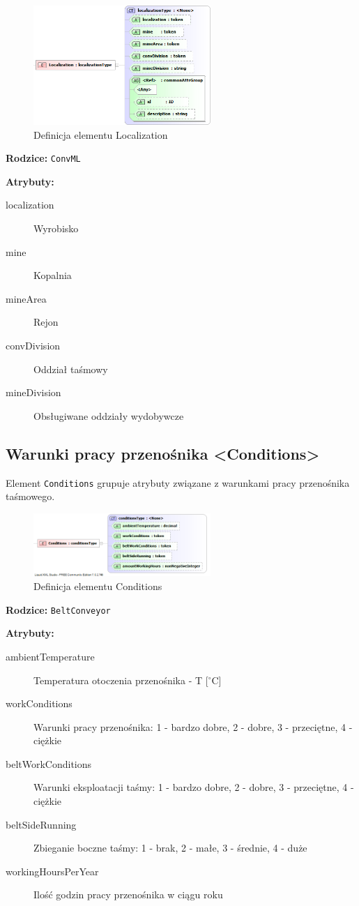 \documentclass[12pt,a4paper]{article}
\begin{document}
\begin{figure}[H]
  \centering
  \includegraphics[width=0.6\textwidth]{png/liquid/Localization}
  \caption{Definicja elementu Localization}
  \label{fig:conditions-xsd}
\end{figure}

\noindent\textbf{Rodzice:} \texttt{ConvML}

\noindent\textbf{Atrybuty:}
\begin{description}
\item[localization] Wyrobisko
\item[mine] Kopalnia
\item[mineArea] Rejon
\item[convDivision] Oddział taśmowy
\item[mineDivision] Obsługiwane oddziały wydobywcze
\end{description}


\subsection{Warunki pracy przenośnika <Conditions>}
Element {\tt Conditions} grupuje atrybuty związane z warunkami pracy przenośnika
taśmowego.

\begin{figure}[H]
  \centering
  \includegraphics[width=0.6\textwidth]{png/liquid/Conditions}
  \caption{Definicja elementu Conditions}
  \label{fig:conditions-xsd}
\end{figure}

\noindent\textbf{Rodzice:} \texttt{BeltConveyor}

\noindent\textbf{Atrybuty:}
\begin{description}
\item[ambientTemperature] Temperatura otoczenia przenośnika - T [$^\circ$C]
\item[workConditions] Warunki pracy przenośnika: 1 - bardzo dobre, 2 - dobre,
  3 - przeciętne, 4 - ciężkie
\item[beltWorkConditions] Warunki eksploatacji taśmy: 1 - bardzo dobre,
  2 - dobre, 3 - przeciętne, 4 - ciężkie
\item[beltSideRunning] Zbieganie boczne taśmy: 1 - brak, 2 - małe, 3 - średnie,
  4 - duże
\item[workingHoursPerYear] Ilość godzin pracy przenośnika w ciągu roku
\end{description}
\end{document}

